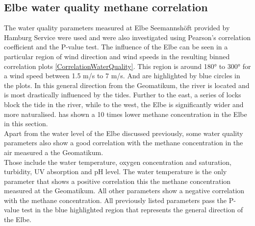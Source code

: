 \subsection{Elbe water quality methane correlation}
The water quality parameters measured at Elbe Seemannshöft provided by Hamburg Service were used \cite{IHUW.20230501} and were also investigated using Pearson's correlation coefficient and the P-value test. The influence of the Elbe can be seen in a particular region of wind direction and wind speeds in the resulting binned correlation plots \cref{CorrelationWaterQuality}. This region is around 180° to 300° for a wind speed between 1.5 m/s to 7 m/s. And are highlighted by blue circles in the plots. In this general direction from the Geomatikum, the river is located and is most drastically influenced by the tides. Further to the east, a series of locks block the tide in the river, while to the west, the Elbe is significantly wider and more naturalised. \cite{Matousu.2019} has shown a 10 times lower methane concentration in the Elbe in this section.\\
Apart from the water level of the Elbe discussed previously, some water quality parameters also show a good correlation with the methane concentration in the air measured a the Geomatikum.\\
Those include the water temperature, oxygen concentration and saturation, turbidity, UV absorption and pH level. The water temperature is the only parameter that shows a positive correlation this the methane concentration measured at the Geomatikum. All other parameters show a negative correlation with the methane concentration. All previously listed parameters pass the P-value test in the blue highlighted region that represents the general direction of the Elbe.
